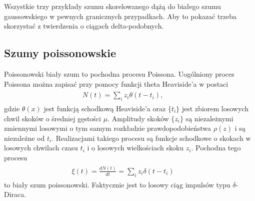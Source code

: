 \documentclass[a4paper,12pt,polish]{sphinxmanual}
\begin{document}
Wszystkie trzy przykłady szumu skorelowanego dążą do białego szumu gaussowskiego w pewnych granicznych przypadkach. Aby to pokazać trzeba skorzystać z twierdzenia o ciągach delta-podobnych.


\subsection{Szumy poissonowskie}
\label{ch3/chIII031:szumy-poissonowskie}
Poissonowski biały szum to pochodna procesu Poissona. Uogólniony proces Poissona można zapisać przy pomocy funkcji theta Heaviside'a w postaci
\label{ch3/chIII031:equation-eqn13}\begin{gather}
\begin{split}N(t) = \sum\limits_i z_i \theta (t-t_i), \qquad\end{split}\label{ch3/chIII031-eqn13}
\end{gather}
gdzie $\theta (x)$ jest funkcją schodkową Heaviside'a oraz $\{t_i\}$ jest zbiorem losowych chwil skoków o średniej gęstości $\mu$. Amplitudy skoków $\{z_i\}$ są niezależnymi zmiennymi losowymi o tym samym rozkładzie prawdopodobieństwa $\rho(z)$ i są niezależne od $t_i$. Realizacjami takiego procesu są funkcje schodkowe o skokach w losowych chwilach czasu $t_i$ i o losowych wielkościach skoku $z_i$. Pochodna tego procesu
\label{ch3/chIII031:equation-eqn14}\begin{gather}
\begin{split}\xi(t) = \frac{dN(t)}{dt}= \sum\limits_i z_i \delta (t-t_i) \qquad\end{split}\label{ch3/chIII031-eqn14}
\end{gather}
to biały szum poissonowski. Faktycznie jest to losowy ciąg impulsów typu $\delta$-Diraca.
\end{document}
